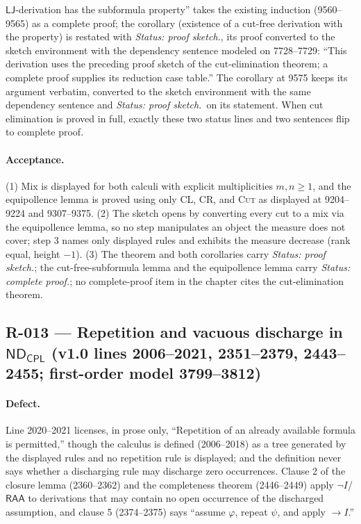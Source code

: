 \(\mathsf{LJ}\)-derivation has the subformula property'' takes the existing
induction (9560--9565) as a complete proof; the corollary (existence of a
cut-free derivation with the property) is restated with \textit{Status:
proof sketch.}, its proof converted to the sketch environment with the
dependency sentence modeled on 7728--7729: ``This derivation uses the
preceding proof sketch of the cut-elimination theorem; a complete proof
supplies its reduction case table.''  The corollary at 9575 keeps its
argument verbatim, converted to the sketch environment with the same
dependency sentence and \textit{Status: proof sketch.}\ on its statement.
When cut elimination is proved in full, exactly these two status lines and
two sentences flip to complete proof.

\paragraph{Acceptance.} (1) Mix is displayed for both calculi with explicit
multiplicities \(m,n\ge1\), and the equipollence lemma is proved using only
\textsc{CL}, \textsc{CR}, and \textsc{Cut} as displayed at 9204--9224 and
9307--9375.  (2) The sketch opens by converting every cut to a mix via the
equipollence lemma, so no step manipulates an object the measure does not
cover; step 3 names only displayed rules and exhibits the measure decrease
(rank equal, height \(-1\)).  (3) The theorem and both
corollaries carry \textit{Status: proof sketch.}; the cut-free-subformula
lemma and the equipollence lemma carry \textit{Status: complete proof.}; no
complete-proof item in the chapter cites the cut-elimination theorem.

\subsection*{R-013 --- Repetition and vacuous discharge in \(\mathsf{ND}_{\mathsf{CPL}}\) (v1.0 lines 2006--2021, 2351--2379, 2443--2455; first-order model 3799--3812)}

\paragraph{Defect.} Line 2020--2021 licenses, in prose only, ``Repetition
of an already available formula is permitted,'' though the calculus is
defined (2006--2018) as a tree generated by the displayed rules and no
repetition rule is displayed; and the definition never says whether a
discharging rule may discharge zero occurrences.  Clause 2 of the closure
lemma (2360--2362) and the completeness theorem (2446--2449) apply
\(\neg I\)/\(\mathsf{RAA}\) to derivations that may contain no open
occurrence of the discharged assumption, and clause 5 (2374--2375) says
``assume \(\varphi\), repeat \(\psi\), and apply \(\to I\).''

